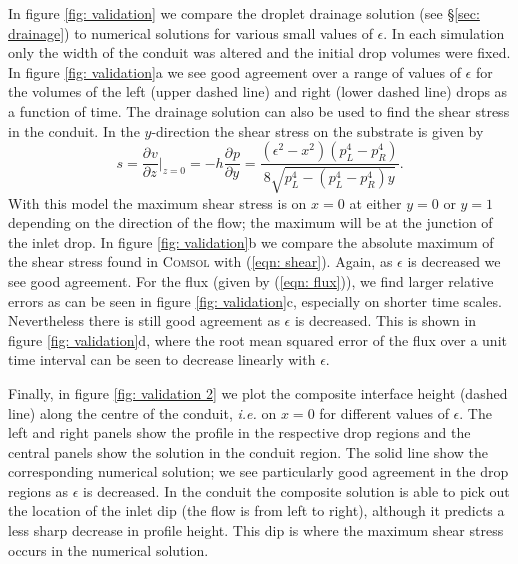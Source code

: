 \documentclass{jfm}
\newcommand{\pD}[3]{\frac{ \partial^{#3} {#1} }{ \partial {#2}^{#3} }}
\begin{document}
  
In figure \ref{fig: validation} we compare the droplet drainage  solution  (see \S \ref{sec: drainage}) to   numerical solutions for various small  values of $\epsilon$.
In each simulation only the width of the  conduit  was altered  and the initial drop  volumes  were fixed.
 In figure \ref{fig: validation}a we see good agreement  over a range of values of $\epsilon$  for the volumes of the left (upper dashed line) and right (lower dashed line) drops  as a function of time.
The drainage solution can also be used to find the shear stress in the conduit.
In the $y$-direction the shear stress on the substrate is given by 
   \begin{equation}
{s} = \pD{v}{z}{} \bigg|_{z=0} =   -h  \pD{p}{y}{} = \frac{\left( \epsilon^2 - x^2\right) \left( p_L^4-p_R^4 \right) }{8 \sqrt{p_L^4 -\left(p_L^4 - p_R^4 \right)y   }}. \label{eqn: shear}
 \end{equation}
With this model the maximum shear stress is on $x=0$ at either $y=0$ or $y=1$ depending on the direction of the flow; the maximum will be at the junction of the  inlet drop.
In figure \ref{fig: validation}b we  compare the absolute  maximum   of the shear stress found in \textsc{Comsol}  with (\ref{eqn: shear}).
Again, as $\epsilon $ is decreased we see good agreement.
For the flux (given by (\ref{eqn: flux})),  we find  larger relative errors as can be seen in figure  \ref{fig: validation}c, especially on shorter time scales. 
Nevertheless there is still good agreement as $\epsilon$ is decreased.
This is shown  in figure    \ref{fig: validation}d, where the root mean squared error of the flux over a unit time interval  can be seen to decrease linearly  with $\epsilon$.


Finally, in {f}igure \ref{fig: validation 2}  we plot the composite  interface height (dashed line) along the centre of the  conduit, {\it {i.e.}\ignorespaces} on  $x=0 $ for different values of $\epsilon$.
The left and right panels show the profile in the respective drop regions and the central panels show the solution in the conduit region.
The solid line show the corresponding  numerical solution;
we see particularly good  agreement in the drop regions as $\epsilon $ is decreased.
In the conduit  the composite solution is able to pick out the location of the inlet dip (the flow is from left   to right), although it predicts a less sharp decrease in profile height.
This dip is  where the  maximum shear stress occurs in the numerical solution.
\end{document}
